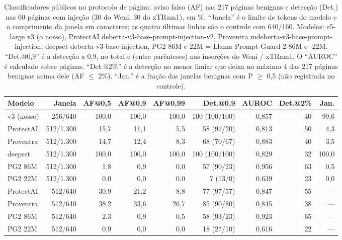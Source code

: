 \documentclass[11pt]{article}
\begin{document}
\begin{table}[tbp]
\centering
\small
\caption{Classificadores públicos no protocolo de página: aviso falso (AF) nas 217 páginas benignas e detecção (Det.) nas 60 páginas com injeção (30 do Weni, 30 do xTRam1), em \%. ``Janela'' é o limite de tokens do modelo e o comprimento da janela em caracteres; as quatro últimas linhas são o controle com 640/160. Modelos: e5-large v3 (o nosso), ProtectAI deberta-v3-base-prompt-injection-v2, Proventra mdeberta-v3-base-prompt-injection, deepset deberta-v3-base-injection, PG2 86M e 22M = Llama-Prompt-Guard-2-86M e -22M. ``Det.@0,9'' é a detecção a 0,9, no total e (entre parênteses) nas inserções do Weni / xTRam1. O ``AUROC'' é calculado sobre páginas. ``Det.@2\%'' é a detecção no menor limiar que deixa no máximo 4 das 217 páginas benignas acima dele (AF \ensuremath{\leq} 2\%). ``Jan.'' é a fração das janelas benignas com P \ensuremath{\geq} 0,5 (não registrada no controle).}\label{tab:8}
\begin{tabular}{@{}lrrrrrrrr@{}}
\toprule
Modelo & Janela & AF@0,5 & AF@0,9 & AF@0,99 & Det.@0,9 & AUROC & Det.@2\% & Jan. \\
\midrule
v3 (nosso) & 256/640 & 100,0 & 100,0 & 100,0 & 100 (100/100) & 0,857 & 40 & 99,6 %
 \\
ProtectAI & 512/1.300 & 15,7 & 11,1 & 5,5 & 58 (97/20) & 0,813 & 50 & 4,3 %
 \\
Proventra & 512/1.300 & 14,7 & 12,4 & 8,3 & 68 (70/67) & 0,883 & 40 & 3,5 %
 \\
deepset & 512/1.300 & 100,0 & 100,0 & 100,0 & 100 (100/100) & 0,829 & 32 & 100,0 %
 \\
PG2 86M & 512/1.300 & 1,8 & 0,9 & 0,0 & 57 (90/23) & 0,956 & 63 & 0,5 %
 \\
PG2 22M & 512/1.300 & 0,0 & 0,0 & 0,0 & 7 (13/0) & 0,639 & 23 & 0,0 %
 \\
ProtectAI & 512/640 & 30,9 & 21,2 & 8,8 & 77 (97/57) & 0,847 & 55 & — %
 \\
Proventra & 512/640 & 38,2 & 33,6 & 26,7 & 85 (90/80) & 0,845 & 38 & — %
 \\
PG2 86M & 512/640 & 2,3 & 0,9 & 0,5 & 58 (93/23) & 0,923 & 65 & — %
 \\
PG2 22M & 512/640 & 0,9 & 0,0 & 0,0 & 18 (27/10) & 0,616 & 22 & — %
 \\
\bottomrule
\end{tabular}
\end{table}
\end{document}
